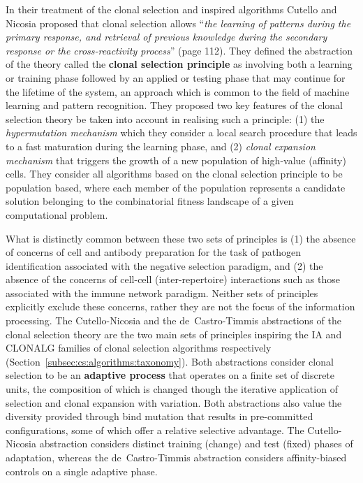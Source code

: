 In their treatment of the clonal selection and inspired algorithms Cutello and Nicosia proposed that clonal selection allows ``\emph{the learning of patterns during the primary response, and retrieval of previous knowledge during the secondary response or the cross-reactivity process}''  \cite{Cutello2005b} (page 112). They defined the abstraction of the theory called the \textbf{clonal selection principle} as involving both a learning or training phase followed by an applied or testing phase that may continue for the lifetime of the system, an approach which is common to the field of machine learning and pattern recognition. They proposed two key features of the clonal selection theory be taken into account in realising such a principle: (1) the \emph{hypermutation mechanism} which they consider a local search procedure that leads to a fast maturation during the learning phase, and (2) \emph{clonal expansion mechanism} that triggers the growth of a new population of high-value (affinity) cells. They consider all algorithms based on the clonal selection principle to be population based, where each member of the population represents a candidate solution belonging to the combinatorial fitness landscape of a given computational problem.

What is distinctly common between these two sets of principles is (1) the absence of concerns of cell and antibody preparation for the task of pathogen identification associated with the negative selection paradigm, and (2) the absence of the concerns of cell-cell (inter-repertoire) interactions such as those associated with the immune network paradigm. Neither sets of principles explicitly exclude these concerns, rather they are not the focus of the information processing. The Cutello-Nicosia and the de~Castro-Timmis abstractions of the clonal selection theory are the two main sets of principles inspiring the IA and CLONALG families of clonal selection algorithms respectively (Section~\ref{subsec:cs:algorithms:taxonomy}). Both abstractions consider clonal selection to be an \textbf{adaptive process} that operates on a finite set of discrete units, the composition of which is changed though the iterative application of selection and clonal expansion with variation. Both abstractions also value the diversity provided through bind mutation that results in pre-committed configurations, some of which offer a relative selective advantage. The Cutello-Nicosia abstraction considers distinct training (change) and test (fixed) phases of adaptation, whereas the de~Castro-Timmis abstraction considers affinity-biased controls on a single adaptive phase. 

